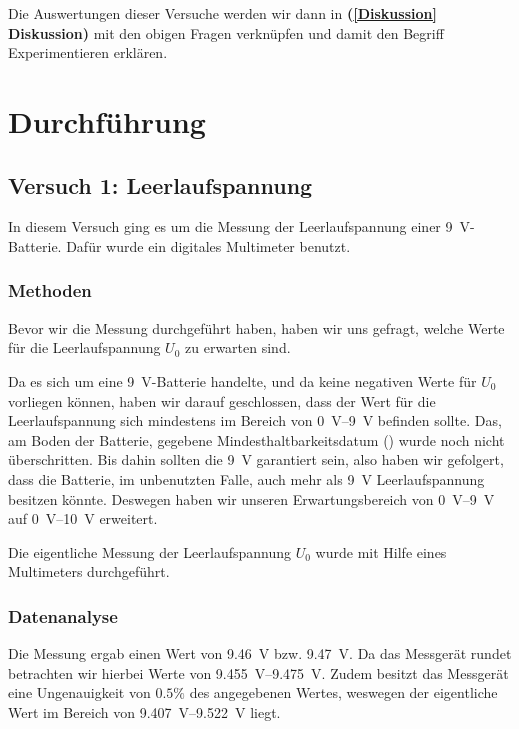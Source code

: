 \documentclass[11pt,a4paper,titlepage, ngerman]{article}
\begin{document}
	Die Auswertungen dieser Versuche werden wir dann in \textbf{(\ref{Diskussion} Diskussion)} mit den obigen Fragen verknüpfen und damit den Begriff \glqq Experimentieren\grqq {} erklären.

\section{Durchführung}

	\subsection{Versuch 1: Leerlaufspannung}
		In diesem Versuch ging es um die Messung der Leerlaufspannung einer \SI{9}{\V}-Batterie. Dafür wurde ein digitales Multimeter benutzt.
		
		\subsubsection{Methoden}
			Bevor wir die Messung durchgeführt haben, haben wir uns gefragt, welche Werte für die Leerlaufspannung $U_0$ zu erwarten sind.
		
			Da es sich um eine \SI{9}{\V}-Batterie handelte, und da keine negativen Werte für $U_0$ vorliegen können, haben wir darauf geschlossen, dass der Wert für die Leerlaufspannung sich mindestens im Bereich von \SIrange{0}{9}{\V} befinden sollte.
			Das, am Boden der Batterie, gegebene Mindesthaltbarkeitsdatum (\grqq) wurde noch nicht überschritten.
			Bis dahin sollten die \SI{9}{\V} garantiert sein, also haben wir gefolgert, dass die Batterie, im unbenutzten Falle, auch mehr als \SI{9}{\V} Leerlaufspannung besitzen könnte.
			Deswegen haben wir unseren Erwartungsbereich von \SIrange{0}{9}{\V} auf \SIrange{0}{10}{\V} erweitert. %
		
			Die eigentliche Messung der Leerlaufspannung $U_0$ wurde mit Hilfe eines Multimeters durchgeführt.
		
		\subsubsection{Datenanalyse}
			Die Messung ergab einen Wert von \SI{9,46}{\V} bzw. \SI{9,47}{\V}.
			Da das Messgerät rundet betrachten wir hierbei Werte von \SIrange{9,455}{9,475}{\V}.
			Zudem besitzt das Messgerät eine Ungenauigkeit von $0.5\%$ des angegebenen Wertes, weswegen der eigentliche Wert im Bereich von \SIrange{9,407}{9,522}{\V} liegt.
		
\end{document}
